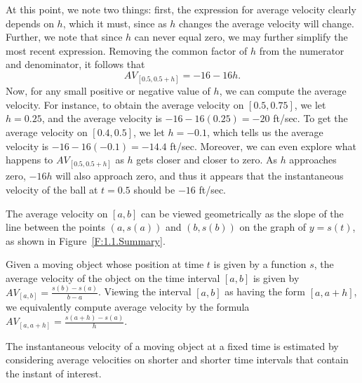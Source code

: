 \documentclass[symmetric,justified,marginals=justified,notoc]{tufte-book}
\theoremstyle{definition}
\begin{document}
At this point, we note two things:  first, the expression for average velocity clearly depends on $h$, which it must, since as $h$ changes the average velocity will change.  Further, we note that since $h$ can never equal zero, we may further simplify the most recent expression.  Removing the common factor of $h$ from the numerator and denominator, it follows that
$$ AV_{[0.5, 0.5+h]} = -16 - 16h.$$
Now, for any small positive or negative value of $h$, we can compute the average velocity.  For instance, to obtain the average velocity on $[0.5,0.75]$, we let $h = 0.25$, and the average velocity is $-16 - 16(0.25) = -20$ ft/sec.  To get the average velocity on $[0.4, 0.5]$, we let $h = -0.1$, which tells us the average velocity is $-16 - 16(-0.1) = -14.4$ ft/sec.  Moreover, we can even explore what happens to $AV_{[0.5, 0.5+h]}$ as $h$ gets closer and closer to zero.  As $h$ approaches zero, $-16h$ will also approach zero, and thus it appears that the instantaneous velocity of the ball at $t = 0.5$ should be $-16$ ft/sec.
\afterex

\begin{summary}
\item The average velocity on $[a,b]$ can be viewed geometrically as the slope of the line between the points $(a,s(a))$ and $(b,s(b))$ on the graph of $y = s(t)$, as shown in Figure~\ref{F:1.1.Summary}.

\item Given a moving object whose position at time $t$ is given by a function $s$, the average velocity of the object on the time interval $[a,b]$ is given by $AV_{[a,b]} = \frac{s(b) - s(a)}{b-a}$.  Viewing the interval $[a,b]$ as having the form $[a,a+h]$, we equivalently compute average velocity by the formula $AV_{[a,a+h]} = \frac{s(a+h) - s(a)}{h}$.
\item The instantaneous velocity of a moving object at a fixed time is estimated by considering average velocities on shorter and shorter time intervals that contain the instant of interest.
\end{summary}
\end{document}
